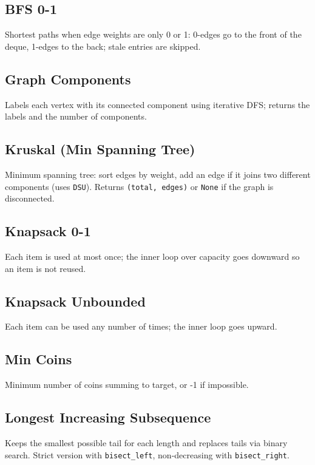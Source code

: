 \subsection{BFS 0-1}
Shortest paths when edge weights are only 0 or 1: 0-edges go to the front of the deque, 1-edges to the back; stale entries are skipped.

\subsection{Graph Components}
Labels each vertex with its connected component using iterative DFS; returns the labels and the number of components.

\subsection{Kruskal (Min Spanning Tree)}
Minimum spanning tree: sort edges by weight, add an edge if it joins two different components (uses \verb|DSU|). Returns \verb|(total, edges)| or \verb|None| if the graph is disconnected.

\subsection{Knapsack 0-1}
Each item is used at most once; the inner loop over capacity goes downward so an item is not reused.

\subsection{Knapsack Unbounded}
Each item can be used any number of times; the inner loop goes upward.

\subsection{Min Coins}
Minimum number of coins summing to target, or -1 if impossible.

\subsection{Longest Increasing Subsequence}
Keeps the smallest possible tail for each length and replaces tails via binary search. Strict version with \verb|bisect_left|, non-decreasing with \verb|bisect_right|.

